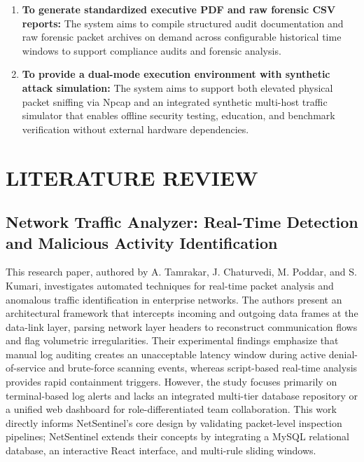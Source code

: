 \documentclass[a4paper,12pt]{report}
\begin{document}
\begin{enumerate}
		\item \textbf{To generate standardized executive PDF and raw forensic CSV reports:}
		The system aims to compile structured audit documentation and raw forensic packet archives on demand across configurable historical time windows to support compliance audits and forensic analysis.
		
		\item \textbf{To provide a dual-mode execution environment with synthetic attack simulation:}
		The system aims to support both elevated physical packet sniffing via Npcap and an integrated synthetic multi-host traffic simulator that enables offline security testing, education, and benchmark verification without external hardware dependencies.
	\end{enumerate}
	
	\chapter{LITERATURE REVIEW}
	
	\section{Network Traffic Analyzer: Real-Time Detection and Malicious Activity Identification}
	\par
	This research paper, authored by A. Tamrakar, J. Chaturvedi, M. Poddar, and S. Kumari, investigates automated techniques for real-time packet analysis and anomalous traffic identification in enterprise networks. The authors present an architectural framework that intercepts incoming and outgoing data frames at the data-link layer, parsing network layer headers to reconstruct communication flows and flag volumetric irregularities. Their experimental findings emphasize that manual log auditing creates an unacceptable latency window during active denial-of-service and brute-force scanning events, whereas script-based real-time analysis provides rapid containment triggers. However, the study focuses primarily on terminal-based log alerts and lacks an integrated multi-tier database repository or a unified web dashboard for role-differentiated team collaboration. This work directly informs NetSentinel's core design by validating packet-level inspection pipelines; NetSentinel extends their concepts by integrating a MySQL relational database, an interactive React interface, and multi-rule sliding windows.~\cite{one}
	
\end{document}
